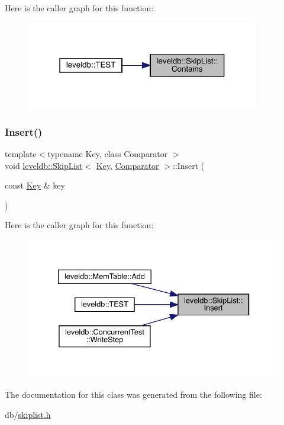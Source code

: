 Here is the caller graph for this function\+:
\nopagebreak
\begin{figure}[H]
\begin{center}
\leavevmode
\includegraphics[width=289pt]{classleveldb_1_1_skip_list_a689b9724beb6c224c01cf1b9d8699e16_icgraph}
\end{center}
\end{figure}
\mbox{\label{classleveldb_1_1_skip_list_af1ed755f0825f38272aafe3cae4da644}} 
\subsubsection{\texorpdfstring{Insert()}{Insert()}}
{\footnotesize\ttfamily template$<$typename Key, class Comparator $>$ \\
void \mbox{\hyperlink{classleveldb_1_1_skip_list}{leveldb\+::\+Skip\+List}}$<$ \mbox{\hyperlink{namespaceleveldb_a7e9a9725b13fa0bd922d885280dfab95}{Key}}, \mbox{\hyperlink{structleveldb_1_1_comparator}{Comparator}} $>$\+::Insert (\begin{DoxyParamCaption}\item[{const \mbox{\hyperlink{namespaceleveldb_a7e9a9725b13fa0bd922d885280dfab95}{Key}} \&}]{key }\end{DoxyParamCaption})}

Here is the caller graph for this function\+:
\nopagebreak
\begin{figure}[H]
\begin{center}
\leavevmode
\includegraphics[width=333pt]{classleveldb_1_1_skip_list_af1ed755f0825f38272aafe3cae4da644_icgraph}
\end{center}
\end{figure}


The documentation for this class was generated from the following file\+:\begin{DoxyCompactItemize}
\item 
db/\mbox{\hyperlink{skiplist_8h}{skiplist.\+h}}\end{DoxyCompactItemize}
